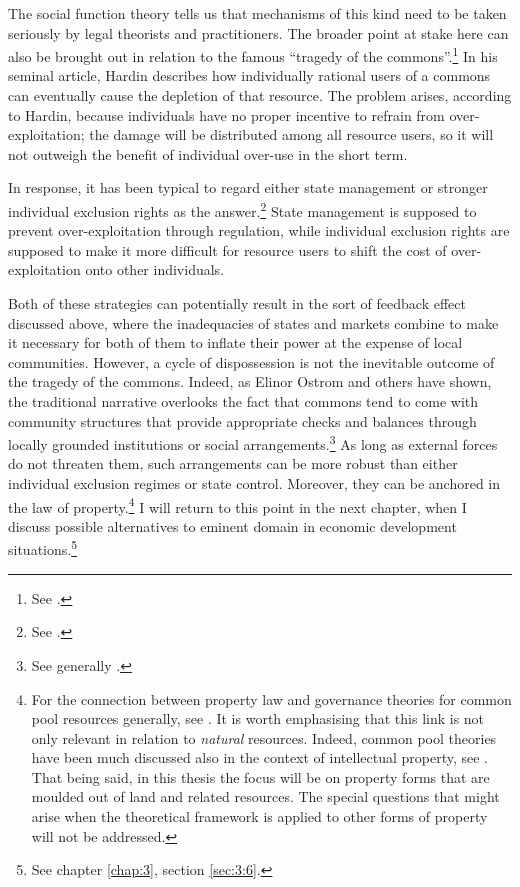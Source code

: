 The social function theory tells us that mechanisms of this kind need to be taken seriously by legal theorists and practitioners. The broader point at stake here can also be brought out in relation to the famous ``tragedy of the commons''.\footnote{See \cite{hardin68}.} In his seminal article, Hardin describes how individually rational users of a commons can eventually cause the depletion of that resource. The problem arises, according to Hardin, because individuals have no proper incentive to refrain from over-exploitation; the damage will be distributed among all resource users, so it will not outweigh the benefit of individual over-use in the short term.


In response, it has been typical to regard either state management or stronger individual exclusion rights as the answer.\footnote{See \cite[8-13]{ostrom90}.} State management is supposed to prevent over-exploitation through regulation, while individual exclusion rights are supposed to make it more difficult for resource users to shift the cost of over-exploitation onto other individuals.

Both of these strategies can potentially result in the sort of feedback effect discussed above, where the inadequacies of states and markets combine to make it necessary for both of them to inflate their power at the expense of local communities. However, a cycle of dispossession is not the inevitable outcome of the tragedy of the commons. Indeed, as Elinor Ostrom and others have shown, the traditional narrative overlooks the fact that commons tend to come with community structures that provide appropriate checks and balances through locally grounded institutions or social arrangements.\footnote{See generally \cite{ostrom90}.} As long as external forces do not threaten them, such arrangements can be more robust than either 
individual exclusion regimes or state control. Moreover, they can be anchored in the law of property.\footnote{For the connection between property law and governance theories for common pool resources generally, see \cite{rose11,fennel11}. It is worth emphasising that this link is not only relevant in relation to {\it natural} resources. Indeed, common pool theories have been much discussed also in the context of intellectual property, see \cite[38-43]{rose11}. That being said, in this thesis the focus will be on property forms that are moulded out of land and related resources. The special questions that might arise when the theoretical framework is applied to other forms of property will not be addressed.} I will return to this point in the next chapter, when I discuss possible alternatives to eminent domain in economic development situations.\footnote{See chapter \ref{chap:3}, section \ref{sec:3:6}.}

